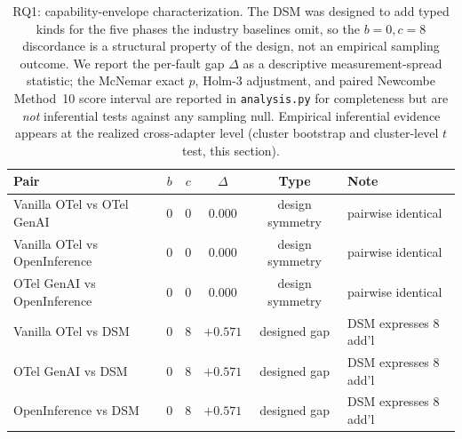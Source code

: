 \documentclass[a4paper,UKenglish,cleveref,autoref,thm-restate]{lipics-v2021}
\begin{document}
\begin{table}[t]
\centering
\small
\caption{RQ1: capability-envelope characterization. The DSM was
designed to add typed kinds for the five phases the industry
baselines omit, so the $b{=}0, c{=}8$ discordance is a structural
property of the design, not an empirical sampling outcome. We report
the per-fault gap $\Delta$ as a descriptive measurement-spread
statistic; the McNemar exact $p$, Holm-3 adjustment, and paired
Newcombe Method~10 score interval are reported in
\texttt{analysis.py} for completeness but are \emph{not} inferential
tests against any sampling null. Empirical inferential evidence
appears at the realized cross-adapter level (cluster bootstrap and
cluster-level $t$ test, this section).}
\label{tab:mcnemar}
\begin{tabular}{lccccl}
\toprule
\textbf{Pair} & $b$ & $c$ & \textbf{$\Delta$} & \textbf{Type} & \textbf{Note} \\
\midrule
Vanilla OTel vs OTel GenAI    & 0 & 0 & $0.000$ & design symmetry & pairwise identical \\
Vanilla OTel vs OpenInference & 0 & 0 & $0.000$ & design symmetry & pairwise identical \\
OTel GenAI vs OpenInference   & 0 & 0 & $0.000$ & design symmetry & pairwise identical \\
\midrule
Vanilla OTel vs DSM           & 0 & 8 & $+0.571$ & designed gap & DSM expresses 8 add'l \\
OTel GenAI vs DSM             & 0 & 8 & $+0.571$ & designed gap & DSM expresses 8 add'l \\
OpenInference vs DSM          & 0 & 8 & $+0.571$ & designed gap & DSM expresses 8 add'l \\
\bottomrule
\end{tabular}
\end{table}
\end{document}
